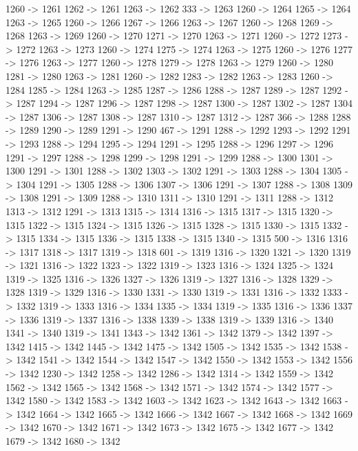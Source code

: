 {	1260 -> 1261
	1262 -> 1261
	1263 -> 1262
	333 -> 1263
	1260 -> 1264
	1265 -> 1264
	1263 -> 1265
	1260 -> 1266
	1267 -> 1266
	1263 -> 1267
	1260 -> 1268
	1269 -> 1268
	1263 -> 1269
	1260 -> 1270
	1271 -> 1270
	1263 -> 1271
	1260 -> 1272
	1273 -> 1272
	1263 -> 1273
	1260 -> 1274
	1275 -> 1274
	1263 -> 1275
	1260 -> 1276
	1277 -> 1276
	1263 -> 1277
	1260 -> 1278
	1279 -> 1278
	1263 -> 1279
	1260 -> 1280
	1281 -> 1280
	1263 -> 1281
	1260 -> 1282
	1283 -> 1282
	1263 -> 1283
	1260 -> 1284
	1285 -> 1284
	1263 -> 1285
	1287 -> 1286
	1288 -> 1287
	1289 -> 1287
	1292 -> 1287
	1294 -> 1287
	1296 -> 1287
	1298 -> 1287
	1300 -> 1287
	1302 -> 1287
	1304 -> 1287
	1306 -> 1287
	1308 -> 1287
	1310 -> 1287
	1312 -> 1287
	366 -> 1288
	1288 -> 1289
	1290 -> 1289
	1291 -> 1290
	467 -> 1291
	1288 -> 1292
	1293 -> 1292
	1291 -> 1293
	1288 -> 1294
	1295 -> 1294
	1291 -> 1295
	1288 -> 1296
	1297 -> 1296
	1291 -> 1297
	1288 -> 1298
	1299 -> 1298
	1291 -> 1299
	1288 -> 1300
	1301 -> 1300
	1291 -> 1301
	1288 -> 1302
	1303 -> 1302
	1291 -> 1303
	1288 -> 1304
	1305 -> 1304
	1291 -> 1305
	1288 -> 1306
	1307 -> 1306
	1291 -> 1307
	1288 -> 1308
	1309 -> 1308
	1291 -> 1309
	1288 -> 1310
	1311 -> 1310
	1291 -> 1311
	1288 -> 1312
	1313 -> 1312
	1291 -> 1313
	1315 -> 1314
	1316 -> 1315
	1317 -> 1315
	1320 -> 1315
	1322 -> 1315
	1324 -> 1315
	1326 -> 1315
	1328 -> 1315
	1330 -> 1315
	1332 -> 1315
	1334 -> 1315
	1336 -> 1315
	1338 -> 1315
	1340 -> 1315
	500 -> 1316
	1316 -> 1317
	1318 -> 1317
	1319 -> 1318
	601 -> 1319
	1316 -> 1320
	1321 -> 1320
	1319 -> 1321
	1316 -> 1322
	1323 -> 1322
	1319 -> 1323
	1316 -> 1324
	1325 -> 1324
	1319 -> 1325
	1316 -> 1326
	1327 -> 1326
	1319 -> 1327
	1316 -> 1328
	1329 -> 1328
	1319 -> 1329
	1316 -> 1330
	1331 -> 1330
	1319 -> 1331
	1316 -> 1332
	1333 -> 1332
	1319 -> 1333
	1316 -> 1334
	1335 -> 1334
	1319 -> 1335
	1316 -> 1336
	1337 -> 1336
	1319 -> 1337
	1316 -> 1338
	1339 -> 1338
	1319 -> 1339
	1316 -> 1340
	1341 -> 1340
	1319 -> 1341
	1343 -> 1342
	1361 -> 1342
	1379 -> 1342
	1397 -> 1342
	1415 -> 1342
	1445 -> 1342
	1475 -> 1342
	1505 -> 1342
	1535 -> 1342
	1538 -> 1342
	1541 -> 1342
	1544 -> 1342
	1547 -> 1342
	1550 -> 1342
	1553 -> 1342
	1556 -> 1342
	1230 -> 1342
	1258 -> 1342
	1286 -> 1342
	1314 -> 1342
	1559 -> 1342
	1562 -> 1342
	1565 -> 1342
	1568 -> 1342
	1571 -> 1342
	1574 -> 1342
	1577 -> 1342
	1580 -> 1342
	1583 -> 1342
	1603 -> 1342
	1623 -> 1342
	1643 -> 1342
	1663 -> 1342
	1664 -> 1342
	1665 -> 1342
	1666 -> 1342
	1667 -> 1342
	1668 -> 1342
	1669 -> 1342
	1670 -> 1342
	1671 -> 1342
	1673 -> 1342
	1675 -> 1342
	1677 -> 1342
	1679 -> 1342
	1680 -> 1342
}
